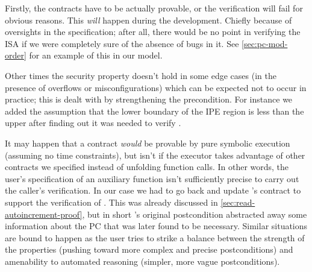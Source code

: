 Firstly, the contracts have to be actually provable, or the verification will fail for obvious reasons. This \emph{will} happen during the development. Chiefly because of oversights in the specification; after all, there would be no point in verifying the ISA if we were completely sure of the absence of bugs in it. See \cref{sec:pc-mod-order} for an example of this in our \msp model.

Other times the security property doesn't hold in some edge cases (\eg in the presence of overflows or misconfigurations) which can be expected not to occur in practice; this is dealt with by strengthening the precondition. For instance we added the assumption that the lower boundary of the IPE region is less than the upper after finding out it was needed to verify .

It may happen that a contract \emph{would} be provable by pure symbolic execution (assuming no time constraints), but isn't if the executor takes advantage of other contracts we specified instead of unfolding function calls. In other words, the user's specification of an auxiliary function isn't sufficiently precise to carry out the caller's verification. In our case we had to go back and update 's contract to support the verification of . This was already discussed in \cref{sec:read-autoincrement-proof}, but in short 's original postcondition abstracted away some information about the PC that was later found to be necessary. Similar situations are bound to happen as the user tries to strike a balance between the strength of the properties (pushing \eg toward more complex and precise postconditions) and amenability to automated reasoning (simpler, more vague postconditions).


